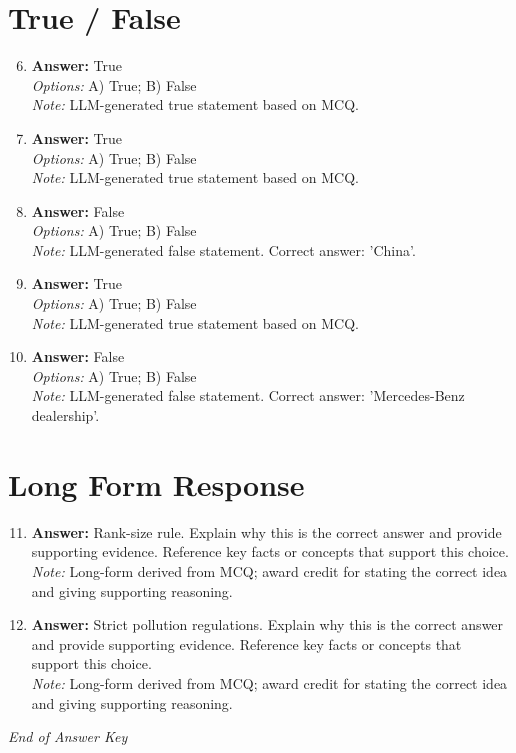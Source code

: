 \documentclass[12pt]{article}
\begin{document}
\section*{True / False}
\begin{enumerate}[label=\arabic*.]
\setcounter{enumi}{5}
\item \textbf{Answer:} True
\\ \textit{Options:} A) True; B) False
\\ \textit{Note:} LLM-generated true statement based on MCQ.
\item \textbf{Answer:} True
\\ \textit{Options:} A) True; B) False
\\ \textit{Note:} LLM-generated true statement based on MCQ.
\item \textbf{Answer:} False
\\ \textit{Options:} A) True; B) False
\\ \textit{Note:} LLM-generated false statement. Correct answer: 'China'.
\item \textbf{Answer:} True
\\ \textit{Options:} A) True; B) False
\\ \textit{Note:} LLM-generated true statement based on MCQ.
\item \textbf{Answer:} False
\\ \textit{Options:} A) True; B) False
\\ \textit{Note:} LLM-generated false statement. Correct answer: 'Mercedes-Benz dealership'.
\end{enumerate}

\section*{Long Form Response}
\begin{enumerate}[label=\arabic*.]
\setcounter{enumi}{10}
\item \textbf{Answer:} Rank-size rule. Explain why this is the correct answer and provide supporting evidence. Reference key facts or concepts that support this choice.
\\ \textit{Note:} Long-form derived from MCQ; award credit for stating the correct idea and giving supporting reasoning.
\item \textbf{Answer:} Strict pollution regulations. Explain why this is the correct answer and provide supporting evidence. Reference key facts or concepts that support this choice.
\\ \textit{Note:} Long-form derived from MCQ; award credit for stating the correct idea and giving supporting reasoning.
\end{enumerate}

\vfill
\noindent\textit{End of Answer Key}
\end{document}
